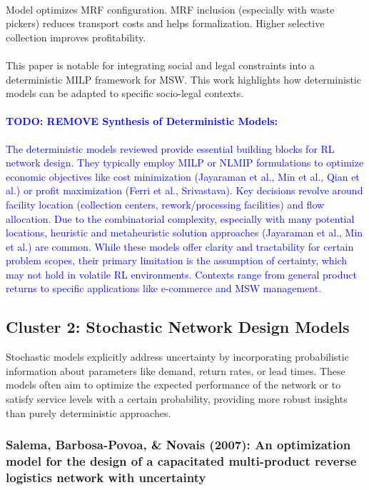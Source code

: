 \paragraph{} Model optimizes MRF configuration. MRF inclusion (especially with waste pickers) reduces transport costs and helps formalization. Higher selective collection improves profitability.

\paragraph{} This paper is notable for integrating social and legal constraints into a deterministic MILP framework for MSW. This work highlights how deterministic models can be adapted to specific socio-legal contexts.

\textcolor{blue}
{\paragraph{TODO: REMOVE Synthesis of Deterministic Models:}
The deterministic models reviewed provide essential building blocks for RL network design. They typically employ MILP or NLMIP formulations to optimize economic objectives like cost minimization (Jayaraman et al., Min et al., Qian et al.) or profit maximization (Ferri et al., Srivastava). Key decisions revolve around facility location (collection centers, rework/processing facilities) and flow allocation. Due to the combinatorial complexity, especially with many potential locations, heuristic and metaheuristic solution approaches (Jayaraman et al., Min et al.) are common. While these models offer clarity and tractability for certain problem scopes, their primary limitation is the assumption of certainty, which may not hold in volatile RL environments. Contexts range from general product returns to specific applications like e-commerce and MSW management.}

\subsection{Cluster 2: Stochastic Network Design Models}
Stochastic models explicitly address uncertainty by incorporating probabilistic information about parameters like demand, return rates, or lead times. These models often aim to optimize the expected performance of the network or to satisfy service levels with a certain probability, providing more robust insights than purely deterministic approaches.

\subsubsection{Salema, Barbosa-Povoa, \& Novais (2007): An optimization model for the design of a capacitated multi-product reverse logistics network with uncertainty}
